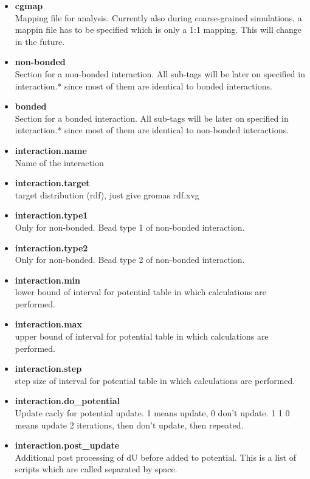 \begin{itemize}
\item \textbf{cgmap} \\
      Mapping file for analysis. Currently also during coarse-grained simulations, a mappin file has to be specified
      which is only a 1:1 mapping. This will change in the future.
\item \textbf{non-bonded} \\
      Section for a non-bonded interaction. All sub-tags will be later on specified in 
      interaction.* since most of them are identical to bonded interactions.
\item \textbf{bonded} \\
      Section for a bonded interaction. All sub-tags will be later on specified in 
      interaction.* since most of them are identical to non-bonded interactions.
\item \textbf{interaction.name} \\
      Name of the interaction
\item \textbf{interaction.target} \\
 target distribution (rdf), just give gromas rdf.xvg 
\item \textbf{interaction.type1} \\
Only for non-bonded. Bead type 1 of non-bonded interaction.
\item \textbf{interaction.type2} \\
Only for non-bonded. Bead type 2 of non-bonded interaction.
\item \textbf{interaction.min} \\
lower bound of interval for potential table in which calculations are performed.
\item \textbf{interaction.max} \\
upper bound of interval for potential table in which calculations are performed.
\item \textbf{interaction.step} \\
step size of interval for potential table in which calculations are performed.
\item \textbf{interaction.do\_potential} \\
Update cacly for potential update. 1 means update, 0 don't update. 1 1 0 means update 2 iterations, then don't update, then repeated. 
\item \textbf{interaction.post\_update} \\
Additional post processing of dU before added to potential. This is a list of scripts which are called separated by space.

\end{itemize}
